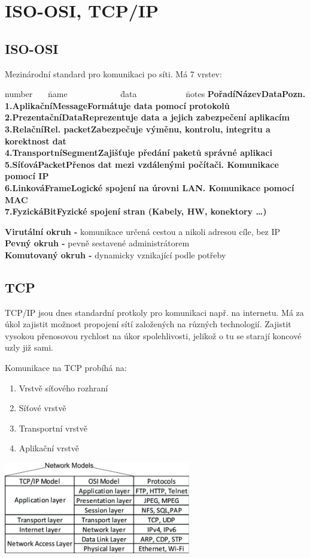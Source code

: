 \section{ISO-OSI, TCP/IP}
\subsection{ISO-OSI}
Mezinárodní standard pro komunikaci po síti. Má 7 vrstev:
\begin{tabbing}
  number ~~~\= name ~~~~~~~~~~~~\= data ~~~~~~~~~~~\= notes \kill
  \bfseries Pořadí\>\bfseries Název\>\bfseries Data\>\bfseries Pozn.\\[2mm]
  1.\>Aplikační\>Message\>Formátuje data pomocí protokolů\\
  2.\>Prezentační\>Data\>Reprezentuje data a jejich zabezpečení aplikacím\\
  3.\>Relační\>Rel. packet\>Zabezpečuje výměnu, kontrolu, integritu a korektnost dat\\
  4.\>Transportní\>Segment\>Zajišťuje předání paketů správné aplikaci\\
  5.\>Síťová\>Packet\>Přenos dat mezi vzdálenými počítači. Komunikace pomocí IP\\
  6.\>Linková\>Frame\>Logické spojení na úrovni LAN. Komunikace pomocí MAC\\
  7.\>Fyzická\>Bit\>Fyzické spojení stran (Kabely, HW, konektory \dots)
\end{tabbing}
\textbf{Virutální okruh -} komunikace určená cestou a nikoli adresou cíle, bez IP \\
\textbf{Pevný okruh -} pevně sestavené administrátorem \\
\textbf{Komutovaný okruh -} dynamicky vznikající podle potřeby

\subsection{TCP}
TCP/IP jsou dnes standardní protkoly pro komunikaci např. na internetu.
Má za úkol zajistit možnost propojení sítí založených na různých technologií.
Zajistit vysokou přenosovou rychlost na úkor spolehlivosti, jelikož o tu se starají koncové uzly již sami.
\begin{multicols}{2}
  Komunikace na TCP probíhá na:
  \begin{enumerate}
    \item Vrstvě síťového rozhraní
    \item Síťové vrstvě
    \item Transportní vrstvě
    \item Aplikační vrstvě
  \end{enumerate}
  \columnbreak
  \includegraphics[height=4cm]{TVY-POS/ISO-OSI-TCP-IP/tcpip.jpg}
\end{multicols}

